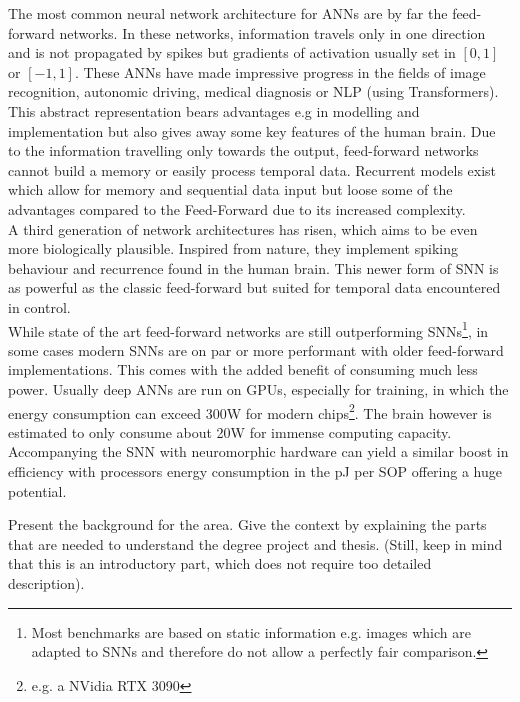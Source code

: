 The most common neural network architecture for \acp{ANN} are by far the feed-forward networks.
In these networks, information travels only in one direction and is not propagated by spikes but gradients of activation usually set in $[0,1]$ or $[-1,1]$.
These \acp{ANN} have made impressive progress in the fields of image recognition, autonomic driving, medical diagnosis\cite{patel_applications_2007} or  \ac{NLP} (using Transformers\cite{vaswani_attention_2017}).\\
This abstract representation bears advantages e.g in modelling and implementation but also gives away some key features of the human brain. Due to the information travelling only towards the output, feed-forward networks cannot build a memory or easily process temporal data. Recurrent models exist which allow for memory \cite{hutchison_biologically_2004} and sequential data input but loose some of the advantages compared to the Feed-Forward due to its increased complexity.\\
A third generation\cite{maass_networks_1997} of network architectures has risen, which aims to be even more biologically plausible. Inspired from nature, they implement spiking behaviour and recurrence found in the human brain.
This newer form of \ac{SNN} is as powerful as the classic feed-forward but suited for temporal data encountered in control.\\
While state of the art feed-forward networks are still outperforming \acp{SNN}\footnote{Most benchmarks are based on static information e.g. images which are adapted to \acp{SNN} and therefore do not allow a perfectly fair comparison.}, in some cases modern \acp{SNN} are on par or more performant with older feed-forward implementations. This comes with the added benefit of consuming much less power. Usually deep \acp{ANN} are run on \acp{GPU}, especially for training, in which the energy consumption can exceed 300W for modern chips\footnote{e.g. a NVidia RTX 3090}. The brain however is estimated to only consume about
20W \cite{clarke_circulation_1999} for immense computing capacity. Accompanying the \ac{SNN} with neuromorphic hardware can yield a similar boost in efficiency with processors energy consumption in the pJ per \ac{SOP}\cite{indiveri_importance_2019} offering a huge potential.




Present the background for the area. Give the context by explaining the parts that are needed to understand the degree project and thesis. (Still, keep in mind that this is an introductory part, which does not require too detailed description).

